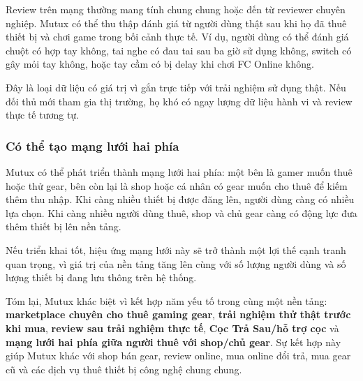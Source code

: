 Review trên mạng thường mang tính chung chung hoặc đến từ reviewer chuyên nghiệp. Mutux có thể thu thập đánh giá từ người dùng thật sau khi họ đã thuê thiết bị và chơi game trong bối cảnh thực tế. Ví dụ, người dùng có thể đánh giá chuột có hợp tay không, tai nghe có đau tai sau ba giờ sử dụng không, switch có gây mỏi tay không, hoặc tay cầm có bị delay khi chơi FC Online không.

Đây là loại dữ liệu có giá trị vì gắn trực tiếp với trải nghiệm sử dụng thật. Nếu đối thủ mới tham gia thị trường, họ khó có ngay lượng dữ liệu hành vi và review thực tế tương tự.

\subsubsection{Có thể tạo mạng lưới hai phía}

Mutux có thể phát triển thành mạng lưới hai phía: một bên là gamer muốn thuê hoặc thử gear, bên còn lại là shop hoặc cá nhân có gear muốn cho thuê để kiếm thêm thu nhập. Khi càng nhiều thiết bị được đăng lên, người dùng càng có nhiều lựa chọn. Khi càng nhiều người dùng thuê, shop và chủ gear càng có động lực đưa thêm thiết bị lên nền tảng.

Nếu triển khai tốt, hiệu ứng mạng lưới này sẽ trở thành một lợi thế cạnh tranh quan trọng, vì giá trị của nền tảng tăng lên cùng với số lượng người dùng và số lượng thiết bị đang lưu thông trên hệ thống.

Tóm lại, Mutux khác biệt vì kết hợp năm yếu tố trong cùng một nền tảng: \textbf{marketplace chuyên cho thuê gaming gear}, \textbf{trải nghiệm thử thật trước khi mua}, \textbf{review sau trải nghiệm thực tế}, \textbf{Cọc Trả Sau/hỗ trợ cọc} và \textbf{mạng lưới hai phía giữa người thuê với shop/chủ gear}. Sự kết hợp này giúp Mutux khác với shop bán gear, review online, mua online đổi trả, mua gear cũ và các dịch vụ thuê thiết bị công nghệ chung chung.

